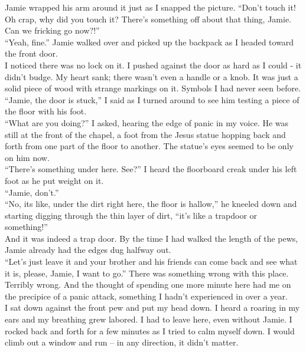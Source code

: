 \documentclass[a5paper]{scrartcl}
\begin{document}
Jamie wrapped his arm around it just as I snapped the picture.
\enquote{Don't touch it! Oh crap, why did you touch it? There's something off about that thing, Jamie. Can we fricking go now?!}\\

\enquote{Yeah, fine.} Jamie walked over and picked up the backpack as I headed toward the front door.\\


I noticed there was no lock on it. I pushed against the door as hard as I could - it didn't budge. My heart sank; there wasn't even a handle or a knob. It was just a solid piece of wood with strange markings on it. Symbols I had never seen before. \\


\enquote{Jamie, the door is stuck,} I said as I turned around to see him testing a piece of the floor with his foot.\\


\enquote{What are you doing?} I asked, hearing the edge of panic in my voice. He was still at the front of the chapel, a foot from the Jesus statue hopping back and forth from one part of the floor to another. The statue's eyes seemed to be only on him now.\\


\enquote{There's something under here. See?} I heard the floorboard creak under his left foot as he put weight on it. \\


\enquote{Jamie, don't.}\\


\enquote{No, its like, under the dirt right here, the floor is hallow,} he kneeled down and starting digging through the thin layer of dirt, \enquote{it's like a trapdoor or something!}\\


And it was indeed a trap door. By the time I had walked the length of the pews, Jamie already had the edges dug halfway out.\\


\enquote{Let's just leave it and your brother and his friends can come back and see what it is, please, Jamie, I want to go.} There was something wrong with this place. Terribly wrong. And the thought of spending one more minute here had me on the precipice of a panic attack, something I hadn't experienced in over a year. \\


I sat down against the front pew and put my head down. I heard a roaring in my ears and my breathing grew labored. I had to leave here, even without Jamie. I rocked back and forth for a few minutes as I tried to calm myself down. I would climb out a window and run – in any direction, it didn't matter.\\
\end{document}
